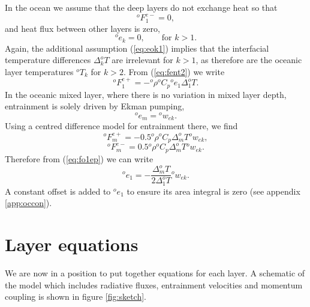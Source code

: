 \documentclass[11pt, a4paper,twoside]{article}
\newcommand{\dt}[2]{\Delta_{#2}^{#1}T}
\newcommand{\rhb}[1]{{{}^{#1}\rho}}
\newcommand{\cp}[1]{{{}^{#1}C_p}}
\newcommand{\ek}[1]{{{}^{#1}w_{ek}}}
\newcommand{\e}[2]{{{}^{#1}e_{#2}}}
\newcommand{\T}[2]{{{}^{#1}T_{#2}}}
\newcommand{\F}[3]{{{}^{#1}F^{#3}_{#2}}}
\numberwithin{equation}{section}
\begin{document}
In the ocean we assume that the deep layers do not exchange heat so that
\begin{equation}
\F{o}{1}{e-} = 0,
\end{equation}
and heat flux between other layers is zero,
\begin{equation}\label{eq:eok1}
\e{o}{k} = 0, \quad \quad \textrm{for } k > 1.
\end{equation}
Again, the additional assumption (\ref{eq:eok1}) implies that the interfacial temperature differences $\dt{o}{k}$ are irrelevant for $k > 1$, as therefore are the oceanic layer temperatures $\T{o}{k}$ for $k > 2$.
From (\ref{eq:fent2}) we write
\begin{equation}\label{eq:fo1ep}
\F{o}{1}{e+} = - \rhb{o} \cp{o}\e{o}{1}\dt{o}{1}.
\end{equation}
In the oceanic mixed layer, where there is no variation in mixed layer depth, entrainment is solely driven by Ekman pumping,
\begin{equation}
\e{o}{m} = \ek{o}.
\end{equation}
Using a centred difference model for entrainment there, we find
\begin{equation}
\F{o}{m}{e+} = -0.5 \rhb{o} \cp{o}\dt{o}{m} \ek{o},
\end{equation}
\begin{equation}
\F{o}{m}{e-} = 0.5 \rhb{o} \cp{o}\dt{o}{m} \ek{o}.
\end{equation}
Therefore from (\ref{eq:fo1ep}) we can write
\begin{equation}\label{eq:fentp}
\e{o}{1} = - \frac{\dt{o}{m}}{2 \dt{o}{1}} \ek{o}.
\end{equation}
A constant offset is added to $\e{o}{1}$ to ensure its area integral is zero (see appendix \ref{app:occon}).

\section{Layer equations}\label{sec:layers}
We are now in a position to put together equations for each layer.
A schematic of the model which includes radiative fluxes, entrainment velocities and momentum coupling is shown in figure \ref{fig:sketch}.
\end{document}
